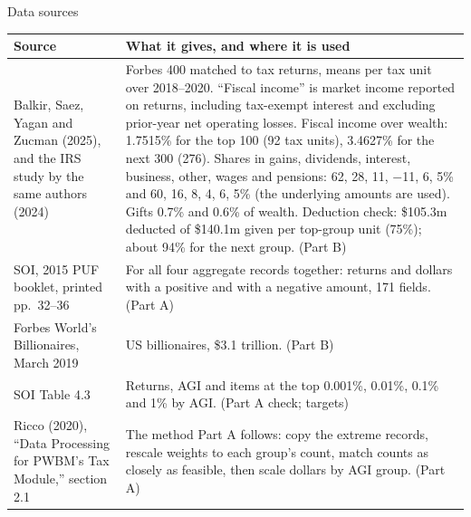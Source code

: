 \begin{frame}{Data sources}
  \scriptsize
  \renewcommand{\arraystretch}{1.15}
  \begin{tabular}{>{\raggedright}p{3.5cm} >{\raggedright\arraybackslash}p{9.6cm}}
    \toprule
    Source & What it gives, and where it is used \\
    \midrule
    Balkir, Saez, Yagan and Zucman (2025), and the IRS study by the same authors (2024)
      & Forbes 400 matched to tax returns, means per tax unit over 2018--2020. ``Fiscal income'' is market
        income reported on returns, including tax-exempt interest and excluding prior-year net operating
        losses. Fiscal income over wealth: 1.7515\% for the top 100 (92 tax units), 3.4627\% for the next
        300 (276). Shares in gains, dividends, interest, business, other, wages and pensions: 62, 28, 11,
        $-$11, 6, 5\% and 60, 16, 8, 4, 6, 5\% (the underlying amounts are used). Gifts 0.7\% and 0.6\% of
        wealth. Deduction check: \$105.3m deducted of \$140.1m given per top-group unit (75\%); about 94\%
        for the next group. (Part B) \\
    SOI, 2015 PUF booklet, printed pp.~32--36
      & For all four aggregate records together: returns and dollars with a positive and with a negative
        amount, 171 fields. (Part A) \\
    Forbes World's Billionaires, March 2019
      & 607 US billionaires, \$3.1 trillion. (Part B) \\
    SOI Table 4.3
      & Returns, AGI and items at the top 0.001\%, 0.01\%, 0.1\% and 1\% by AGI. (Part A check; targets) \\
    Ricco (2020), ``Data Processing for PWBM's Tax Module,'' section 2.1
      & The method Part A follows: copy the extreme records, rescale weights to each group's count, match
        counts as closely as feasible, then scale dollars by AGI group. (Part A) \\
    \bottomrule
  \end{tabular}
\end{frame}

